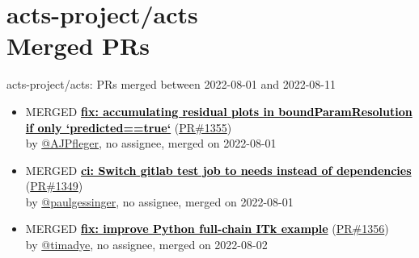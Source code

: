 \providecommand{\prmerged}{MERGED }
\providecommand{\propen}{OPEN }
\providecommand{\prwip}{WIP }
\providecommand{\prstale}{STALE }
\providecommand{\iss}{}
    

\providecommand{\cusemoji}[1]{}
\providecommand{\emojispace}[1]{}








\section{ acts-project/acts \\ Merged PRs}
\begin{frame}[allowframebreaks]{ acts-project/acts: PRs merged 
between 2022-08-01 and 2022-08-11
}

  \begin{itemize}
    
    \item\prmerged
    \hspace*{0.1em}
    \textbf{\href{https://github.com/acts-project/acts/pull/1355}{\textcolor{black}{fix: accumulating residual plots in boundParamResolution if only `predicted==true`}}}
    (\href{https://github.com/acts-project/acts/pull/1355}{PR\#1355}) \\
    by \href{https://github.com/AJPfleger}{@AJPfleger}, {}no assignee, merged on 2022-08-01

    \item\prmerged
    \hspace*{0.1em}
    \textbf{\href{https://github.com/acts-project/acts/pull/1349}{\textcolor{black}{ci: Switch gitlab test job to needs instead of dependencies}}}
    (\href{https://github.com/acts-project/acts/pull/1349}{PR\#1349}) \\
    by \href{https://github.com/paulgessinger}{@paulgessinger}, {}no assignee, merged on 2022-08-01

    \item\prmerged
    \hspace*{0.1em}
    \textbf{\href{https://github.com/acts-project/acts/pull/1356}{\textcolor{black}{fix: improve Python full-chain ITk example}}}
    (\href{https://github.com/acts-project/acts/pull/1356}{PR\#1356}) \\
    by \href{https://github.com/timadye}{@timadye}, {}no assignee, merged on 2022-08-02


\end{itemize}
\end{frame}
